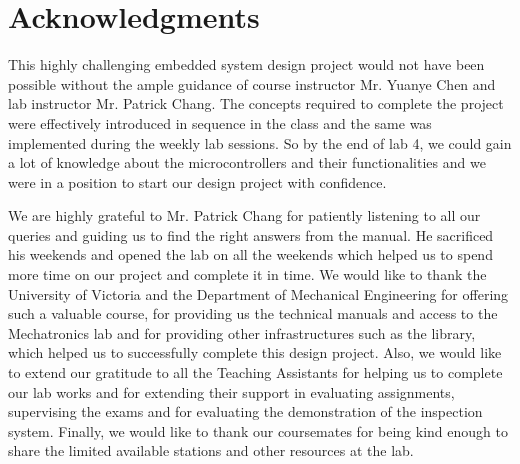 \section*{Acknowledgments}\label{sec:acknowledgments}
This highly challenging embedded system design project would not have been possible without the ample guidance of course instructor Mr. Yuanye Chen and lab instructor Mr. Patrick Chang. The concepts required to complete the project were effectively introduced in sequence in the class and the same was implemented during the weekly lab sessions. So by the end of lab 4, we could gain a lot of knowledge about the microcontrollers and their functionalities and we were in a position to start our design project with confidence.

We are highly grateful to Mr. Patrick Chang for patiently listening to all our queries and guiding us to find the right answers from the manual. He sacrificed his weekends and opened the lab on all the weekends which helped us to spend more time on our project and complete it in time.
We would like to thank the University of Victoria and the Department of Mechanical Engineering for offering such a valuable course, for providing us the technical manuals and access to the Mechatronics lab and for providing other infrastructures such as the library, which helped us to successfully complete this design project.
Also, we would like to extend our gratitude to all the Teaching Assistants for helping us to complete our lab works and for extending their support in evaluating assignments, supervising the exams and for evaluating the demonstration of the inspection system. Finally, we would like to thank our coursemates for being kind enough to share the limited available stations and other resources at the lab.
